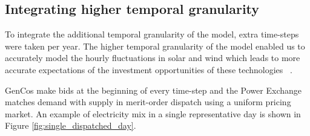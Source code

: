 %
%
%
%
%


\subsection{Integrating higher temporal granularity}

To integrate the additional temporal granularity of the model, extra time-steps were taken per year. The higher temporal granularity of the model enabled us to accurately model the hourly fluctuations in solar and wind  which leads to more accurate expectations of the investment opportunities of these technologies ~\cite{Ludig2011,Haydt2011}.

GenCos make bids at the beginning of every time-step and the Power Exchange matches demand with supply in merit-order dispatch using a uniform pricing market. An example of electricity mix in a single representative day is shown in Figure \ref{fig:single_dispatched_day}. 

%

